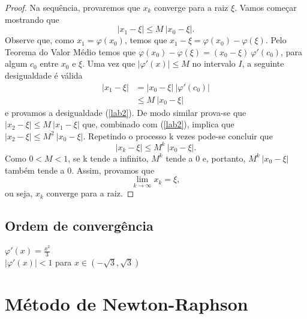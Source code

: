 \begin{proof}
    Na sequência, provaremos que $x_k$ converge para a raiz $\xi$. Vamos começar mostrando que 
    \begin{equation}\label{lab2}
        |x_1 - \xi| \leq M \ |x_0 - \xi|.
    \end{equation}
    Observe que, como $x_1=\varphi(x_0)$, temos que $x_1 - \xi = \varphi(x_0) - \varphi(\xi)$. Pelo Teorema do Valor Médio temos que $\varphi(x_0) - \varphi(\xi) = (x_0 - \xi) \ \varphi'(c_0)$, para algum $c_0$ entre $x_0$ e $\xi$. Uma vez que $|\varphi'(x)| \leq M$ no intervalo $I$, a seguinte desigualdade é válida
    \begin{align*}
        |x_1 - \xi|&= |x_0 - \xi| \ |\varphi'(c_0)|\\
        &\leq M \ |x_0 - \xi|
    \end{align*}
    e provamos a desigualdade (\ref{lab2}).
    De modo similar prova-se que $|x_2 - \xi| \leq M \ |x_1 - \xi|$ que, combinado com (\ref{lab2}), implica que $|x_2 - \xi| \leq M^2 \ |x_0 - \xi|$. Repetindo o processo k vezes pode-se concluir que
    \begin{equation}
        |x_k - \xi| \leq M^k \ |x_0 - \xi|.
    \end{equation}
    Como $0 < M < 1$, se k tende a infinito, $M^k$ tende a 0 e, portanto, $M^k \ |x_0 - \xi|$ também tende a 0. Assim, provamos que
    \begin{equation}
        \lim_{k \to \infty} x_k = \xi, \label{conv.mpf}
    \end{equation}
    ou seja, $x_k$ converge para a raiz.
\end{proof}

\subsection{Ordem de convergência}


$\varphi'(x) = \frac{x^2}{3}$ \\ $|\varphi'(x)| < 1$ para $x \in (-\sqrt{3}, \sqrt{3})$ 
    
\section{Método de Newton-Raphson}
